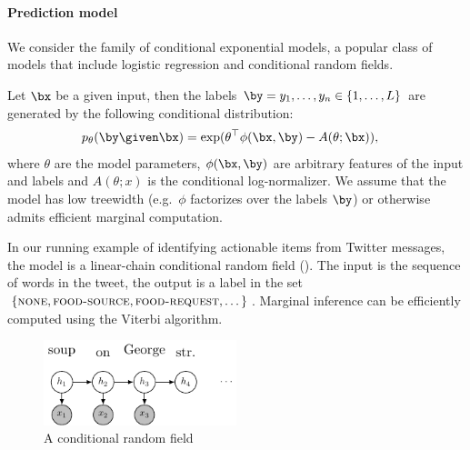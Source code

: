 \paragraph{Prediction model}
We consider the family of conditional exponential models, a popular class of models that include logistic regression and conditional random fields.

Let $\bx$ be a given input, then the labels $\by = y_1, \ldots, y_n \in \{1, \dots, L\}$ are generated by the following conditional distribution:
\begin{align*}
  \p(\by \given \bx) 
  &= \exp( \theta^\top \phi(\bx, \by) - A(\theta; \bx)),
\end{align*}
where $\theta$ are the model parameters,
$\phi(\bx, \by)$ are arbitrary features of the input and labels and 
$A(\theta; x)$ is the conditional log-normalizer.
We assume that the model has low treewidth (e.g.\ $\phi$ factorizes over the labels $\by$) or otherwise admits efficient marginal computation.

In our running example of identifying actionable items from Twitter messages, the model is a linear-chain conditional random field (). The input is the sequence of words in the tweet, the output is a label in the set $\{\textsc{none}, \textsc{food-source},  \textsc{food-request}, \dots\}$. Marginal inference can be efficiently computed using the Viterbi algorithm.


\begin{figure}[t]
  \begin{centering}
  \includegraphics[width=0.5\textwidth]{figures/simple-crf.pdf}
  \end{centering}
  \caption{A conditional random field }
\label{fig:crf}
\end{figure}

